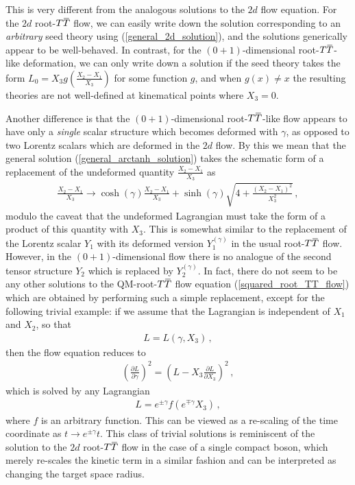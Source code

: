 \documentclass[12pt]{article}
\numberwithin{equation}{section}
\newcommand{\overbar}[1]{\mkern 1.5mu\overline{\mkern-1.5mu#1\mkern-1.5mu}\mkern 1.5mu}
\def\TT{{T\overbar{T}}}
\begin{document}
This is very different from the analogous solutions to the $2d$ flow equation. For the $2d$ root-$\TT$ flow, we can easily write down the solution corresponding to an \emph{arbitrary} seed theory using (\ref{general_2d_solution}), and the solutions generically appear to be well-behaved. In contrast, for the $(0+1)$-dimensional root-$\TT$-like deformation, we can only write down a solution if the seed theory takes the form $L_0 = X_3 g \left( \frac{X_2 - X_1}{X_3} \right)$ for some function $g$, and when $g(x) \neq x$ the resulting theories are not well-defined at kinematical points where $X_3 = 0$.

Another difference is that the $(0+1)$-dimensional root-$\TT$-like flow appears to have only a \emph{single} scalar structure which becomes deformed with $\gamma$, as opposed to two Lorentz scalars which are deformed in the $2d$ flow. By this we mean that the general solution (\ref{general_arctanh_solution}) takes the schematic form of a replacement of the undeformed quantity $\frac{X_2 - X_1}{X_3}$ as
%
\begin{align}
    \frac{X_2 - X_1}{X_3} \longrightarrow \cosh ( \gamma ) \frac{X_2 - X_1}{X_3} + \sinh ( \gamma ) \sqrt{ 4 + \frac{ \left( X_2 - X_1 \right)^2}{ X_3^2 } } \, , 
\end{align}
%
modulo the caveat that the undeformed Lagrangian must take the form of a product of this quantity with $X_3$. This is somewhat similar to the replacement of the Lorentz scalar $Y_1$ with its deformed version $Y_1^{(\gamma)}$ in the usual root-$\TT$ flow. However, in the $(0+1)$-dimensional flow there is no analogue of the second tensor structure $Y_2$ which is replaced by $Y_2^{(\gamma)}$. In fact, there do not seem to be any other solutions to the QM-root-$\TT$ flow equation (\ref{squared_root_TT_flow}) which are obtained by performing such a simple replacement, except for the following trivial example: if we assume that the Lagrangian is independent of $X_1$ and $X_2$, so that
%
\begin{align}
    L = L ( \gamma, X_3 ) \, , 
\end{align}
%
then the flow equation reduces to
%
\begin{align}
    \left( \frac{\partial L}{\partial \gamma} \right)^2 = \left( L - X_3 \frac{\partial L}{\partial X_3} \right)^2 \, , 
\end{align}
%
which is solved by any Lagrangian
%
\begin{align}
    L = e^{\pm \gamma} f \left( e^{\mp \gamma} X_3 \right) \, , 
\end{align}
%
where $f$ is an arbitrary function. This can be viewed as a re-scaling of the time coordinate as $t \to e^{\pm \gamma} t$. This class of trivial solutions is reminiscent of the solution to the $2d$ root-$\TT$ flow in the case of a single compact boson, which merely re-scales the kinetic term in a similar fashion and can be interpreted as changing the target space radius.
\end{document}

